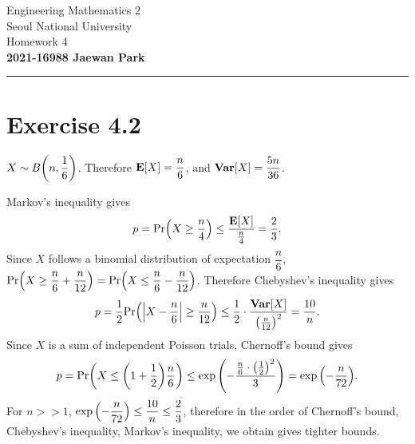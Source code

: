 \documentclass{article}
\begin{document}
\vspace*{-1.5cm}
{\centering \vbox{%
\vspace{2mm}
\large
Engineering Mathematics 2 \hfill
\\
Seoul National University
\\[4mm]
Homework 4\\
\textbf{2021-16988 Jaewan Park} \\[0.8mm]
}}
\par\noindent\rule{\textwidth}{0.5pt}

\section*{Exercise 4.2}
$X \sim B\qty(n, \dfrac{1}{6})$. Therefore $\mathbf{E}\qty[X] = \dfrac{n}{6}$, and $\mathbf{Var}\qty[X] = \dfrac{5n}{36}$.

\vspace{3mm}
Markov's inequality gives 
$$p = \mathrm{Pr}\qty(X \geq \frac{n}{4}) \leq \frac{\mathbf{E}\qty[X]}{\frac{n}{4}} = \frac{2}{3}.$$
Since $X$ follows a binomial distribution of expectation $\dfrac{n}{6}$, $\mathrm{Pr}\qty(X \geq \dfrac{n}{6} + \dfrac{n}{12}) = \mathrm{Pr}\qty(X \leq \dfrac{n}{6} - \dfrac{n}{12})$. Therefore Chebyshev's inequality gives
$$p = \frac{1}{2}\mathrm{Pr}\qty(\qty|X - \frac{n}{6}| \geq \frac{n}{12}) \leq \frac{1}{2}\cdot\frac{\mathbf{Var}\qty[X]}{\qty(\frac{n}{12})^2} = \frac{10}{n}.$$
Since $X$ is a sum of independent Poisson trials, Chernoff's bound gives
$$p = \mathrm{Pr}\qty(X \leq \qty(1 + \frac{1}{2})\frac{n}{6}) \leq \exp\qty(-\frac{\frac{n}{6} \cdot \qty(\frac{1}{2})^2}{3}) = \exp\qty(-\frac{n}{72}).$$
For $n >> 1$, $\exp\qty(-\dfrac{n}{72}) \leq \dfrac{10}{n} \leq \dfrac{2}{3}$, therefore in the order of Chernoff's bound, Chebyshev's inequality, Markov's inequality, we obtain gives tighter bounds.
\end{document}
